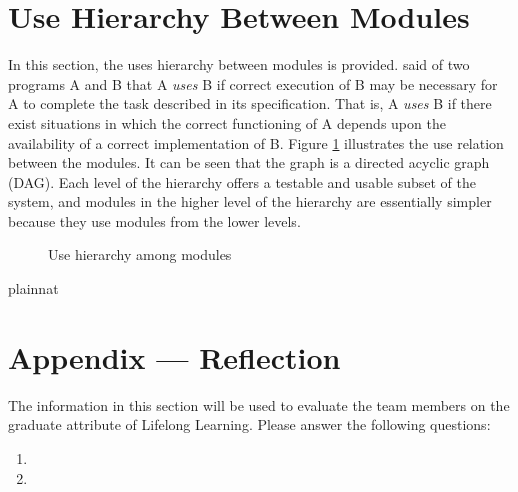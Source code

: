 \documentclass[12pt, titlepage]{article}
\begin{document}
\section{Use Hierarchy Between Modules} \label{SecUse}

In this section, the uses hierarchy between modules is
provided. \citet{Parnas1978} said of two programs A and B that A {\em uses} B if
correct execution of B may be necessary for A to complete the task described in
its specification. That is, A {\em uses} B if there exist situations in which
the correct functioning of A depends upon the availability of a correct
implementation of B.  Figure \ref{FigUH} illustrates the use relation between
the modules. It can be seen that the graph is a directed acyclic graph
(DAG). Each level of the hierarchy offers a testable and usable subset of the
system, and modules in the higher level of the hierarchy are essentially simpler
because they use modules from the lower levels.

\begin{figure}[H]
\centering
\caption{Use hierarchy among modules}
\label{FigUH}
\end{figure}


 {plainnat}


\newpage{}
\section*{Appendix --- Reflection}

The information in this section will be used to evaluate the team members on the
graduate attribute of Lifelong Learning.  Please answer the following questions:

\begin{enumerate}
  \item 
  \item 
\end{enumerate}
\end{document}

